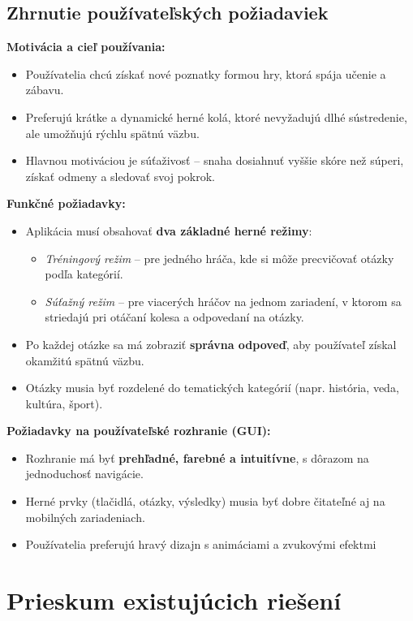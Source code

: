 \documentclass[a4paper,12pt]{article}
\begin{document}
    \subsection{Zhrnutie používateľských požiadaviek}
    
    \textbf{Motivácia a cieľ používania:}
    \begin{itemize}
        \item Používatelia chcú získať nové poznatky formou hry, ktorá spája učenie a zábavu.
        \item Preferujú krátke a dynamické herné kolá, ktoré nevyžadujú dlhé sústredenie, ale umožňujú rýchlu spätnú väzbu.
        \item Hlavnou motiváciou je súťaživosť – snaha dosiahnuť vyššie skóre než súperi, získať odmeny a sledovať svoj pokrok.
    \end{itemize}
    \textbf{Funkčné požiadavky:}
    \begin{itemize}
        \item Aplikácia musí obsahovať \textbf{dva základné herné režimy}:
        \begin{itemize}
            \item \textit{Tréningový režim} – pre jedného hráča, kde si môže precvičovať otázky podľa kategórií.
            \item \textit{Súťažný režim} – pre viacerých hráčov na jednom zariadení, v ktorom sa striedajú pri otáčaní kolesa a odpovedaní na otázky.
        \end{itemize}
        \item Po každej otázke sa má zobraziť \textbf{správna odpoveď}, aby používateľ získal okamžitú spätnú väzbu.
        \item Otázky musia byť rozdelené do tematických kategórií (napr. história, veda, kultúra, šport).
    \end{itemize}
    \textbf{Požiadavky na používateľské rozhranie (GUI):}
    \begin{itemize}
        \item Rozhranie má byť \textbf{prehľadné, farebné a intuitívne}, s dôrazom na jednoduchosť navigácie.
        \item Herné prvky (tlačidlá, otázky, výsledky) musia byť dobre čitateľné aj na mobilných zariadeniach.
        \item Používatelia preferujú hravý dizajn s animáciami a zvukovými efektmi
    \end{itemize}
    	
    	\section{Prieskum existujúcich riešení}
\end{document}
